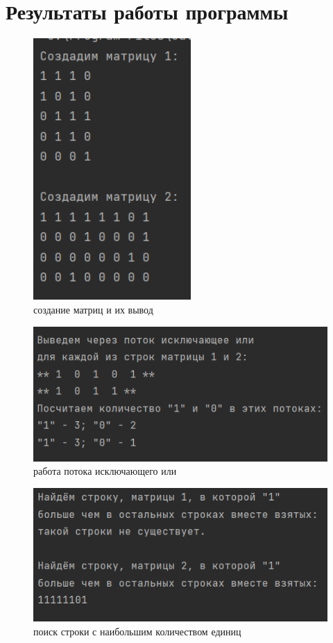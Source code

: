 ﻿\documentclass[a4paper, 12pt]{extarticle}
\begin{document}
\section{Результаты работы программы}
\begin{figure}[H]
    \centering
    \includegraphics[width=170pt]{Test.png}
    \caption{создание матриц и их вывод}
    \label{fig:my_label}
\end{figure}

\begin{figure}[H]
    \centering
    \includegraphics[width=400pt]{Test1.png}
    \caption{работа потока исключающего или}
    \label{fig:my_label}
\end{figure}

\begin{figure}[H]
    \centering
    \includegraphics[width=400pt]{Test2.png}
    \caption{поиск строки с наибольшим количеством единиц}
    \label{fig:my_label}
\end{figure}
\end{document}
